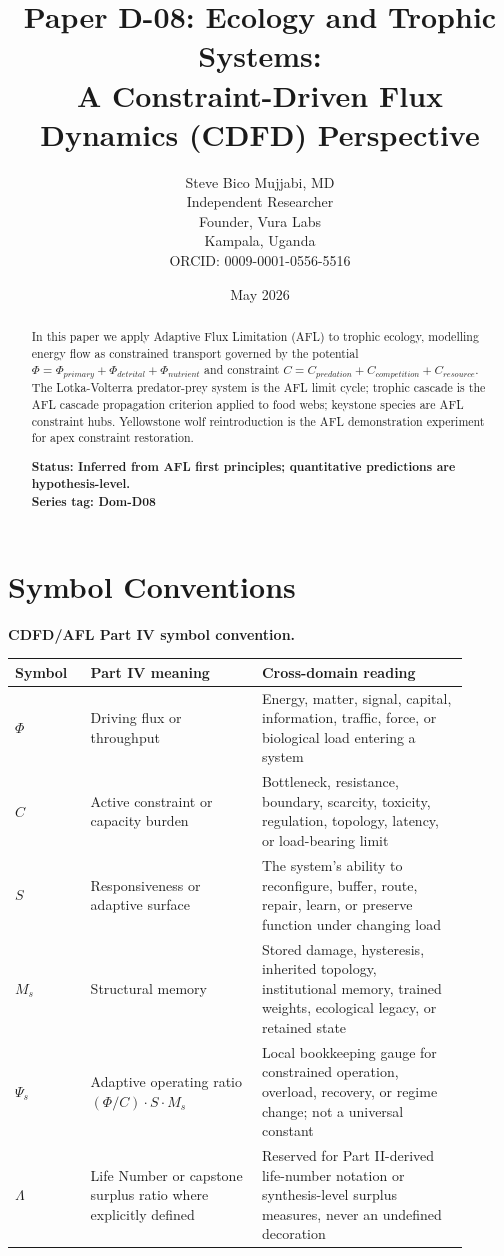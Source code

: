 \documentclass[11pt]{article}
\title{\textbf{Paper D-08: Ecology and Trophic Systems:\\ A Constraint-Driven Flux Dynamics (CDFD) Perspective}}
\author{Steve Bico Mujjabi, MD\\
\small Independent Researcher\\
\small Founder, Vura Labs\\
\small Kampala, Uganda\\
\small ORCID: 0009-0001-0556-5516}
\date{May 2026}
\begin{document}
\maketitle
\newpage


\begin{abstract}
In this paper we apply Adaptive Flux Limitation (AFL) to trophic ecology, modelling energy flow
as constrained transport governed by the potential $\Phi = \Phi_{primary} + \Phi_{detrital}
+ \Phi_{nutrient}$ and constraint $C = C_{predation} + C_{competition} + C_{resource}$. The
Lotka-Volterra predator-prey system is the AFL limit cycle; trophic cascade is the AFL cascade
propagation criterion applied to food webs; keystone species are AFL constraint hubs. Yellowstone
wolf reintroduction is the AFL demonstration experiment for apex constraint restoration.

\textbf{Status: Inferred from AFL first principles; quantitative predictions are hypothesis-level.}\\
\textbf{Series tag: Dom-D08}
\end{abstract}

\section*{Symbol Conventions}

\noindent\textbf{CDFD/AFL Part IV symbol convention.}
\begin{center}
{\small
\begin{tabular}{p{0.15\linewidth}p{0.34\linewidth}p{0.41\linewidth}}
\hline
Symbol & Part IV meaning & Cross-domain reading \\
\hline
$\Phi$ & Driving flux or throughput & Energy, matter, signal, capital, information, traffic, force, or biological load entering a system \\
$C$ & Active constraint or capacity burden & Bottleneck, resistance, boundary, scarcity, toxicity, regulation, topology, latency, or load-bearing limit \\
$S$ & Responsiveness or adaptive surface & The system's ability to reconfigure, buffer, route, repair, learn, or preserve function under changing load \\
$M_s$ & Structural memory & Stored damage, hysteresis, inherited topology, institutional memory, trained weights, ecological legacy, or retained state \\
$\Psi_s$ & Adaptive operating ratio $(\Phi/C)\cdot S\cdot M_s$ & Local bookkeeping gauge for constrained operation, overload, recovery, or regime change; not a universal constant \\
$\Lambda$ & Life Number or capstone surplus ratio where explicitly defined & Reserved for Part II-derived life-number notation or synthesis-level surplus measures, never an undefined decoration \\
\hline
\end{tabular}
}
\end{center}
\end{document}
